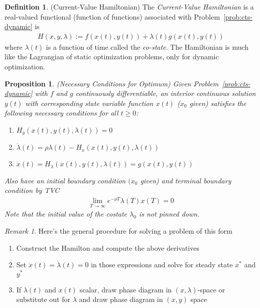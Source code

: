 \documentclass[12pt]{article}
\numberwithin{equation}{section} %
\theoremstyle{plain}
\newtheorem{prop}[thm]{Proposition}
\theoremstyle{definition}
\newtheorem{defn}[thm]{Definition}
\theoremstyle{remark}
\newtheorem*{rmk}{Remark}
\newcommand{\limT}{\lim_{T\rightarrow\infty}}
\begin{document}
\begin{defn}{(Current-Value Hamiltonian)}
The \emph{Current-Value Hamiltonian} is a real-valued functional
(function of functions) associated with Problem~\ref{prob:cts-dynamic}
is
\begin{align*}
  H(x,y,\lambda) := f(x(t),y(t)) + \lambda(t) g(x(t),y(t))
\end{align*}
where $\lambda(t)$ is a function of time called the \emph{co-state}.
The Hamiltonian is much like the Lagrangian of static optimization
problems, only for dynamic optimization.
\end{defn}

\begin{prop}\emph{(Necessary Conditions for Optimum)}
Given Problem~\ref{prob:cts-dynamic} with $f$ and $g$ continuously
differentiable, an interior continuous solution $y(t)$ with corresponding
state variable function $x(t)$ ($x_0$ given) satisfies the following
necessary conditions for all $t\geq 0$:
\begin{enumerate}
  \item $H_y (x(t),y(t),\lambda(t)) = 0$
  \item $\dot{\lambda}(t) = \rho\lambda(t)- H_x(x(t), y(t), \lambda(t))$
  \item $\dot{x}(t) = H_\lambda(x(t),y(t),\lambda(t)) = g(x(t), y(t))$
\end{enumerate}
Also have an initial boundary condition $(x_0$ given) and terminal
boundary condition by TVC
\begin{align*}
  \limT e^{-\rho T} \lambda(T)x(T)=0
\end{align*}
Note that the initial value of the costate $\lambda_0$ is \emph{not}
pinned down.
\end{prop}
\begin{rmk}
Here's the general procedure for solving a problem of this form
\begin{enumerate}[label=(\roman*)]
  \item Construct the Hamilton and compute the above derivatives
  \item Set $\dot{x}(t)=\dot{\lambda}(t)=0$ in those expressions and solve
    for steady state $x^*$ and $y^*$
  \item
    If $\lambda(t)$ and $x(t)$ scalar, draw phase diagram in
    $(x,\lambda)$-space or substitute out for $\lambda$ and draw phase
    diagram in $(x,y)$ space
\end{enumerate}
\end{rmk}

\end{document}
